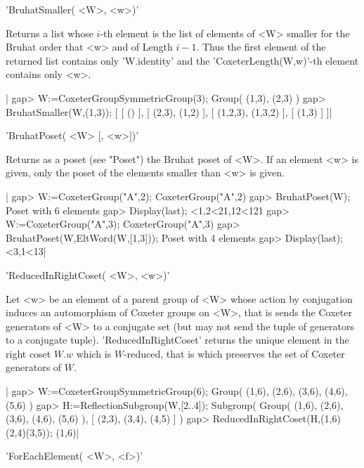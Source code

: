 'BruhatSmaller( <W>, <w>)'

Returns  a list  whose $i$-th  element is  the list  of elements  of <W>
smaller for  the Bruhat  order that  <w> and of  Length $i-1$.  Thus the
first element  of the returned  list contains only 'W.identity'  and the
'CoxeterLength(W,w)'-th element contains only <w>.

|    gap> W:=CoxeterGroupSymmetricGroup(3);
    Group( (1,3), (2,3) )
    gap> BruhatSmaller(W,(1,3));
    [ [ () ], [ (2,3), (1,2) ], [ (1,2,3), (1,3,2) ], [ (1,3) ] ]|


'BruhatPoset( <W> [, <w>])'

Returns as a poset (see "Poset") the Bruhat poset of <W>. If an element <w>
is given, only the poset of the elements smaller than <w> is given.

|    gap> W:=CoxeterGroup("A",2);          
    CoxeterGroup("A",2)
    gap> BruhatPoset(W);
    Poset with 6 elements
    gap> Display(last);
    <1,2<21,12<121
    gap> W:=CoxeterGroup("A",3);
    CoxeterGroup("A",3)
    gap> BruhatPoset(W,EltWord(W,[1,3]));
    Poset with 4 elements
    gap> Display(last);
    <3,1<13|


'ReducedInRightCoset( <W>, <w>)'

Let  <w>  be an  element  of  a parent  group  of  <W> whose  action  by
conjugation induces  an automorphism of  Coxeter groups on <W>,  that is
sends the Coxeter generators of <W> to a conjugate set (but may not send
the  tuple of  generators to  a conjugate  tuple). 'ReducedInRightCoset'
returns  the  unique   element  in  the  right  coset   $W.w$  which  is
$W$-reduced, that  is which preserves  the set of Coxeter  generators of
$W$.

|    gap> W:=CoxeterGroupSymmetricGroup(6);
    Group( (1,6), (2,6), (3,6), (4,6), (5,6) )
    gap> H:=ReflectionSubgroup(W,[2..4]);
    Subgroup( Group( (1,6), (2,6), (3,6), (4,6), (5,6) ),
    [ (2,3), (3,4), (4,5) ] )
    gap> ReducedInRightCoset(H,(1,6)(2,4)(3,5));
    (1,6)|


'ForEachElement( <W>, <f>)'

